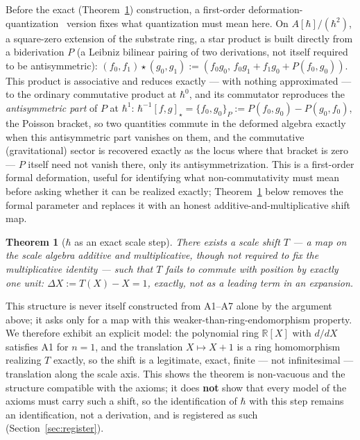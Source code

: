\documentclass[pdflatex,sn-mathphys-num]{sn-jnl}
\theoremstyle{thmstyleone}
\newtheorem{theorem}{Theorem}
\theoremstyle{thmstylethree}
\theoremstyle{thmstyletwo}
\begin{document}
Before the exact (Theorem~\ref{thm:hbar}) construction, a first-order
deformation-quantization~\cite{Bayen1978} version fixes what
quantization must mean here. On $A[\hbar]/(\hbar^2)$,
a square-zero extension of the substrate ring, a star product is built
directly from a biderivation $P$ (a Leibniz bilinear pairing of two
derivations, not itself required to be antisymmetric):
$(f_0,f_1)\star(g_0,g_1) := (f_0g_0,\, f_0g_1+f_1g_0+P(f_0,g_0))$. This
product is associative and reduces exactly — with nothing approximated —
to the ordinary commutative product at $\hbar^0$, and its commutator
reproduces the \emph{antisymmetric part} of $P$ at $\hbar^1$:
$\hbar^{-1}[f,g]_\star = \{f_0,g_0\}_P := P(f_0,g_0)-P(g_0,f_0)$, the
Poisson bracket, so two quantities commute in the deformed algebra
exactly when this antisymmetric part vanishes on them, and the
commutative (gravitational) sector is recovered exactly as the locus
where that bracket is zero — $P$ itself need not vanish there, only its
antisymmetrization. This is a first-order formal deformation, useful for
identifying what non-commutativity must mean
before asking whether it can be realized exactly; Theorem~\ref{thm:hbar}
below removes the formal parameter and replaces it with an honest
additive-and-multiplicative shift map.

\begin{theorem}[$\hbar$ as an exact scale step]\label{thm:hbar}
There exists a scale shift $T$ — a map on the scale algebra additive and
multiplicative, though not required to fix the multiplicative identity —
such that $T$ fails to commute with position by exactly one unit:
$\Delta X := T(X)-X=1$, exactly, not as a leading term in an expansion.
\end{theorem}

This structure is never itself constructed from A1–A7 alone by the
argument above; it asks only for a map with this weaker-than-ring-endomorphism
property.
We therefore exhibit an explicit model: the polynomial ring
$\mathbb{R}[X]$ with $d/dX$ satisfies A1 for $n=1$, and the translation
$X\mapsto X+1$ is a ring homomorphism realizing $T$ exactly, so the shift
is a legitimate, exact, finite — not infinitesimal — translation along
the scale axis. This shows the theorem is non-vacuous and the structure
compatible with the axioms; it does \textbf{not} show that every model of
the axioms must carry such a shift, so the identification of $\hbar$ with
this step remains an identification, not a derivation, and is registered
as such (Section~\ref{sec:register}).
\end{document}
